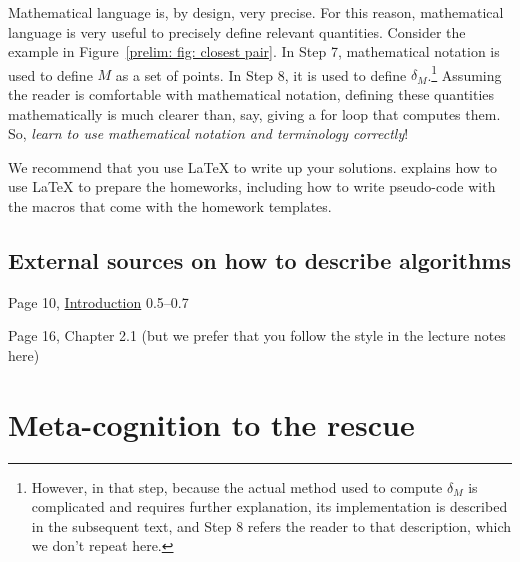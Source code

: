 \documentclass[11pt]{article}
\begin{document}
Mathematical language is, by design, very precise.
For this reason, mathematical language is very useful to precisely define relevant quantities.
Consider the example in Figure~\ref{prelim: fig: closest pair}.
In Step 7, mathematical notation is used to define $M$ as a set of points.
In Step 8, it is used to define $\delta_M$.\footnote
{However, in that step, because the actual method used to compute $\delta_M$ is complicated and requires further explanation, its implementation is described in the subsequent text, and Step 8 refers the reader to that description, which we don't repeat here.}
Assuming the reader is comfortable with mathematical notation, defining these quantities mathematically 
is much clearer than, say, giving a for loop that computes them.
So, \emph{learn to use mathematical notation and terminology correctly}!

We recommend that you use LaTeX to write up your solutions.
 explains how to use LaTeX to prepare the homeworks,
including how to write pseudo-code with the macros that come with the homework templates.

\subsection{External sources on how to describe algorithms}
\begin{mylist}[-]
\item \JE Page 10,
  \href{https://jeffe.cs.illinois.edu/teaching/algorithms/book/!!-frontmatter.pdf}{Introduction} 0.5--0.7
\item \CLRS Page 16, Chapter 2.1 (but we prefer that you follow the style in the lecture notes here)
\end{mylist}

\vfill





\section{Meta-cognition to the rescue}
\end{document}
